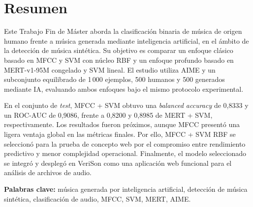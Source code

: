 \chapter*{Resumen}

Este Trabajo Fin de Máster aborda la clasificación binaria de música de origen humano frente a música generada mediante inteligencia artificial, en el ámbito de la detección de música sintética. Su objetivo es comparar un enfoque clásico basado en MFCC y SVM con núcleo RBF y un enfoque profundo basado en MERT-v1-95M congelado y SVM lineal. El estudio utiliza AIME y un subconjunto equilibrado de 1\,000 ejemplos, 500 humanos y 500 generados mediante IA, evaluando ambos enfoques bajo el mismo protocolo experimental.

En el conjunto de \textit{test}, MFCC + SVM obtuvo una \textit{balanced accuracy} de 0,8333 y un ROC-AUC de 0,9086, frente a 0,8200 y 0,8985 de MERT + SVM, respectivamente. Los resultados fueron próximos, aunque MFCC presentó una ligera ventaja global en las métricas finales. Por ello, MFCC + SVM RBF se seleccionó para la prueba de concepto web por el compromiso entre rendimiento predictivo y menor complejidad operacional. Finalmente, el modelo seleccionado se integró y desplegó en VeriSon como una aplicación web funcional para el análisis de archivos de audio.

\vspace{.5cm}

\textbf{Palabras clave:} música generada por inteligencia artificial, detección de música sintética, clasificación de audio, MFCC, SVM, MERT, AIME.